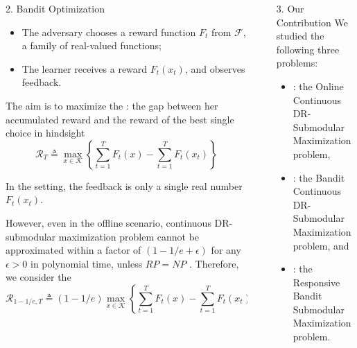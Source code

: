 \documentclass[final]{beamer}
\newcommand{\constraint}{\mathcal{K}}
\newcommand{\OCSM}{\texttt{OCSM}\xspace}
\newcommand{\BCSM}{\texttt{BCSM}\xspace}
\newcommand{\RBSM}{\texttt{RBSM}\xspace}
\newlength{\sepwid}
\newlength{\onecolwid}
\begin{document}
\begin{frame}[t]
\begin{columns}[t]
\begin{column}{\onecolwid}
\begin{block}{2. Bandit Optimization}
\begin{itemize}
				\item The adversary chooses a reward function $F_t$ from $ 
				\mathcal{F} 
				$, a family  
				of real-valued functions;
				
				\item The learner receives a reward $F_t(x_{t})$, and observes 
				feedback.
			\end{itemize}
			The aim is to maximize the : the 
			gap between 
			her 
			accumulated reward and the reward of the best single choice in 
			hindsight
			$$
			\mathcal{R}_{T} \triangleq \max_{x\in \constraint} \left\{ 
			\sum_{t=1}^T 
			F_t(x) - 
			\sum_{t=1}^T F_t(x_t)\right\}
			$$
			
			In the  setting, the feedback is only a 
			single real 
			number 
			$F_t(x_t)$. 
			
		
		However, even in the offline scenario, continuous 
		DR-submodular maximization problem cannot be approximated within a 
		factor of $(1-1/e+\epsilon)$ for any $\epsilon>0$ in polynomial time, 
		unless 
		$RP=NP$ \citep{bian16guaranteed}. Therefore, we consider the 
		\[
		\mathcal{R}_{1-1/e, T} \triangleq(1-1/e) \max_{x\in \constraint} 
		\left\{ 
		\sum_{t=1}^T 
		F_t(x) - \sum_{t=1}^T F_t(x_t)\right\}.
		\]
		
		\end{block}

%
%
%
%
%
%
%
%
%
%
%
%
%
%
%
%
%
%
			
		\end{column} %
 		\begin{column}{\sepwid}\end{column} %
\begin{column}{\onecolwid} %
\vspace{-40pt}

\begin{block}{3. Our Contribution}
We studied the following three problems:
\begin{itemize}
	\item \structure{\OCSM}: the Online Continuous DR-Submodular Maximization 
	problem, 
	\item \structure{\BCSM}: the Bandit Continuous DR-Submodular Maximization 
	problem, and 
	\item \structure{\RBSM}: the Responsive Bandit Submodular Maximization 
	problem.
\end{itemize}


\end{block}
\end{column}
\end{columns}
\end{frame}
\end{document}
